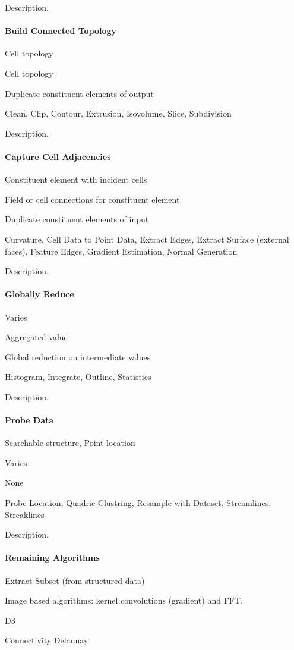 \documentclass{sig-alternate}
\newcommand{\algorithmclasssection}[1]{\paragraph{#1}}
\newcommand{\algorithmclass}[5]{
  \algorithmclasssection{#1} %
  \begin{description}[leftmargin=4.5em,style=nextline,noitemsep]
  \item[Input] #2
  \item[Output] #3
  \item[Overlap] #4
  \item[Algorithms] #5
  \end{description}
}
\begin{document}
\noindent
Description.


\algorithmclass{Build Connected Topology}
               {Cell topology} %
               {Cell topology} %
               {Duplicate constituent elements of output} %
               {Clean, Clip, Contour, Extrusion, Isovolume, Slice, Subdivision}

\noindent
Description.


\algorithmclass{Capture Cell Adjacencies}
               {Constituent element with incident cells} %
               {Field or cell connections for constituent element} %
               {Duplicate constituent elements of input} %
               {Curvature, Cell Data to Point Data, Extract Edges, Extract
                 Surface (external faces), Feature Edges, Gradient
                 Estimation, Normal Generation}

\noindent
Description.


\algorithmclass{Globally Reduce}
               {Varies} %
               {Aggregated value} %
               {Global reduction on intermediate values} %
               {Histogram, Integrate, Outline, Statistics}

\noindent
Description.


\algorithmclass{Probe Data}
               {Searchable structure, Point location} %
               {Varies} %
               {None} %
               {Probe Location, Quadric Clustring, Resample with Dataset,
                 Streamlines, Streaklines}

\noindent
Description.



\algorithmclasssection{Remaining Algorithms}

Extract Subset (from structured data)

Image based algorithms: kernel convolutions (gradient) and FFT.

D3

Connectivity
Delaunay




\end{document}
